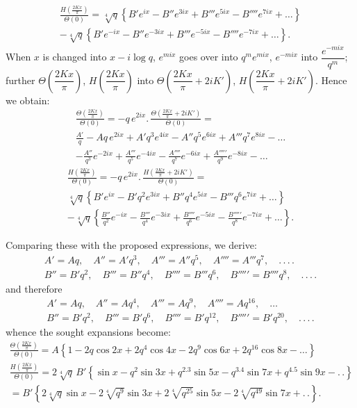 \documentclass{article}
\begin{document}
\[
\begin{gathered}
\frac{H\left(\frac{2Kx}{\pi}\right)}{\Theta(0)}=\sqrt[4]{q}\left\{B'e^{ix}-B''e^{3ix}+B'''e^{5ix}-B''''e^{7ix}+\ldots\right\}\\[1.5ex]
-\sqrt[4]{q}\left\{B'e^{-ix}-B''e^{-3ix}+B'''e^{-5ix}-B''''e^{-7ix}+\ldots\right\}.
\end{gathered}
\]
When $x$ is changed into $x-i\log q$, $e^{mix}$ goes over into $q^{m}e^{mix}$, $e^{-mix}$ into $\dfrac{e^{-mix}}{q^{m}}$; further $\Theta\left(\dfrac{2Kx}{\pi}\right)$, $H\left(\dfrac{2Kx}{\pi}\right)$ into $\Theta\left(\dfrac{2Kx}{\pi}+2iK'\right)$, $H\left(\dfrac{2Kx}{\pi}+2iK'\right)$. Hence we obtain:
\[
\begin{gathered}
\frac{\Theta\left(\frac{2Kx}{\pi}\right)}{\Theta(0)}=-q\,e^{2ix}.\,\frac{\Theta\left(\frac{2Kx}{\pi}+2iK'\right)}{\Theta(0)}=\\[1.5ex]
\frac{A'}{q}-Aq\,e^{2ix}+A'q^{3}e^{4ix}-A''q^{5}e^{6ix}+A'''q^{7}e^{8ix}-\ldots\\[1.5ex]
-\frac{A''}{q^{3}}e^{-2ix}+\frac{A'''}{q^{5}}e^{-4ix}-\frac{A''''}{q^{7}}e^{-6ix}+\frac{A'''''}{q^{9}}e^{-8ix}-\ldots
\end{gathered}
\]
\[
\begin{gathered}
\frac{H\left(\frac{2Kx}{\pi}\right)}{\Theta(0)}=-q\,e^{2ix}.\,\frac{H\left(\frac{2Kx}{\pi}+2iK'\right)}{\Theta(0)}=\\[1.5ex]
\sqrt[4]{q}\left\{B'e^{ix}-B'q^{2}e^{3ix}+B''q^{4}e^{5ix}-B'''q^{6}e^{7ix}+\ldots\right\}\\[1.5ex]
-\sqrt[4]{q}\left\{\frac{B''}{q^{2}}e^{-ix}-\frac{B'''}{q^{4}}e^{-3ix}+\frac{B''''}{q^{6}}e^{-5ix}-\frac{B'''''}{q^{8}}e^{-7ix}+\ldots\right\}.
\end{gathered}
\]

Comparing these with the proposed expressions, we derive:
\[
\begin{gathered}
A'=Aq,\quad A''=A'q^{3},\quad A'''=A''q^{5},\quad A''''=A'''q^{7},\quad.\,.\,.\,.\\[1ex]
B''=B'q^{2},\quad B'''=B''q^{4},\quad B''''=B'''q^{6},\quad B'''''=B''''q^{8},\quad.\,.\,.\,.
\end{gathered}
\]
and therefore
\[
\begin{gathered}
A'=Aq,\quad A''=Aq^{4},\quad A'''=Aq^{9},\quad A''''=Aq^{16},\quad\ldots\\[1ex]
B''=B'q^{2},\quad B'''=B'q^{6},\quad B''''=B'q^{12},\quad B'''''=B'q^{20},\quad.\,.\,.\,.
\end{gathered}
\]
whence the sought expansions become:
\[
\begin{gathered}
\frac{\Theta\left(\frac{2Kx}{\pi}\right)}{\Theta(0)}=A\left\{1-2q\cos 2x+2q^{4}\cos 4x-2q^{9}\cos 6x+2q^{16}\cos 8x-\ldots\right\}\\[2ex]
\frac{H\left(\frac{2Kx}{\pi}\right)}{\Theta(0)}=2\sqrt[4]{q}\,B'\left\{\sin x-q^{2}\sin 3x+q^{2.3}\sin 5x-q^{3.4}\sin 7x+q^{4.5}\sin 9x-.\,.\right\}\\[1.5ex]
=B'\left\{2\sqrt[4]{q}\sin x-2\sqrt[4]{q^{9}}\sin 3x+2\sqrt[4]{q^{25}}\sin 5x-2\sqrt[4]{q^{49}}\sin 7x+.\,.\right\}.
\end{gathered}
\]
\end{document}

